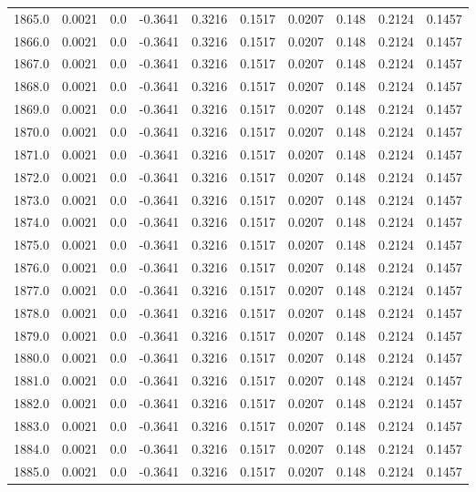 \begin{longtable}{lrrrrrrrrr}
1865.0 & 0.0021 & 0.0 & -0.3641 & 0.3216 & 0.1517 & 0.0207 & 0.148 & 0.2124 & 0.1457 \\
1866.0 & 0.0021 & 0.0 & -0.3641 & 0.3216 & 0.1517 & 0.0207 & 0.148 & 0.2124 & 0.1457 \\
1867.0 & 0.0021 & 0.0 & -0.3641 & 0.3216 & 0.1517 & 0.0207 & 0.148 & 0.2124 & 0.1457 \\
1868.0 & 0.0021 & 0.0 & -0.3641 & 0.3216 & 0.1517 & 0.0207 & 0.148 & 0.2124 & 0.1457 \\
1869.0 & 0.0021 & 0.0 & -0.3641 & 0.3216 & 0.1517 & 0.0207 & 0.148 & 0.2124 & 0.1457 \\
1870.0 & 0.0021 & 0.0 & -0.3641 & 0.3216 & 0.1517 & 0.0207 & 0.148 & 0.2124 & 0.1457 \\
1871.0 & 0.0021 & 0.0 & -0.3641 & 0.3216 & 0.1517 & 0.0207 & 0.148 & 0.2124 & 0.1457 \\
1872.0 & 0.0021 & 0.0 & -0.3641 & 0.3216 & 0.1517 & 0.0207 & 0.148 & 0.2124 & 0.1457 \\
1873.0 & 0.0021 & 0.0 & -0.3641 & 0.3216 & 0.1517 & 0.0207 & 0.148 & 0.2124 & 0.1457 \\
1874.0 & 0.0021 & 0.0 & -0.3641 & 0.3216 & 0.1517 & 0.0207 & 0.148 & 0.2124 & 0.1457 \\
1875.0 & 0.0021 & 0.0 & -0.3641 & 0.3216 & 0.1517 & 0.0207 & 0.148 & 0.2124 & 0.1457 \\
1876.0 & 0.0021 & 0.0 & -0.3641 & 0.3216 & 0.1517 & 0.0207 & 0.148 & 0.2124 & 0.1457 \\
1877.0 & 0.0021 & 0.0 & -0.3641 & 0.3216 & 0.1517 & 0.0207 & 0.148 & 0.2124 & 0.1457 \\
1878.0 & 0.0021 & 0.0 & -0.3641 & 0.3216 & 0.1517 & 0.0207 & 0.148 & 0.2124 & 0.1457 \\
1879.0 & 0.0021 & 0.0 & -0.3641 & 0.3216 & 0.1517 & 0.0207 & 0.148 & 0.2124 & 0.1457 \\
1880.0 & 0.0021 & 0.0 & -0.3641 & 0.3216 & 0.1517 & 0.0207 & 0.148 & 0.2124 & 0.1457 \\
1881.0 & 0.0021 & 0.0 & -0.3641 & 0.3216 & 0.1517 & 0.0207 & 0.148 & 0.2124 & 0.1457 \\
1882.0 & 0.0021 & 0.0 & -0.3641 & 0.3216 & 0.1517 & 0.0207 & 0.148 & 0.2124 & 0.1457 \\
1883.0 & 0.0021 & 0.0 & -0.3641 & 0.3216 & 0.1517 & 0.0207 & 0.148 & 0.2124 & 0.1457 \\
1884.0 & 0.0021 & 0.0 & -0.3641 & 0.3216 & 0.1517 & 0.0207 & 0.148 & 0.2124 & 0.1457 \\
1885.0 & 0.0021 & 0.0 & -0.3641 & 0.3216 & 0.1517 & 0.0207 & 0.148 & 0.2124 & 0.1457 \\

\end{longtable}

